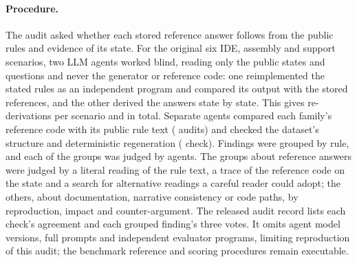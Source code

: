 \paragraph{Procedure.}
The audit asked whether each stored reference answer follows from the public rules and evidence of its state.
For the original six IDE, assembly and support scenarios, two LLM agents worked blind, reading only the public states and questions and never the generator or reference code: one reimplemented the stated rules as an independent program and compared its output with the stored references, and the other derived the answers state by state.
This gives \AuditRederivationsPerScenarioWord{} re-derivations per scenario and \AuditRederivations{} in total.
Separate agents compared each family's reference code with its public rule text (\AuditCodeTextChecksWord{} audits) and checked the dataset's structure and deterministic regeneration (\AuditStructuralChecksWord{} check).
Findings were grouped by rule, and each of the \AuditFindingGroups{} groups was judged by \AuditLensesWord{} agents.
The \AuditReferenceFindingGroups{} groups about reference answers were judged by a literal reading of the rule text, a trace of the reference code on the state and a search for alternative readings a careful reader could adopt; the others, about documentation, narrative consistency or code paths, by reproduction, impact and counter-argument.
The released audit record lists each check's agreement and each grouped finding's three votes. It omits agent model versions, full prompts and independent evaluator programs, limiting reproduction of this audit; the benchmark reference and scoring procedures remain executable.

